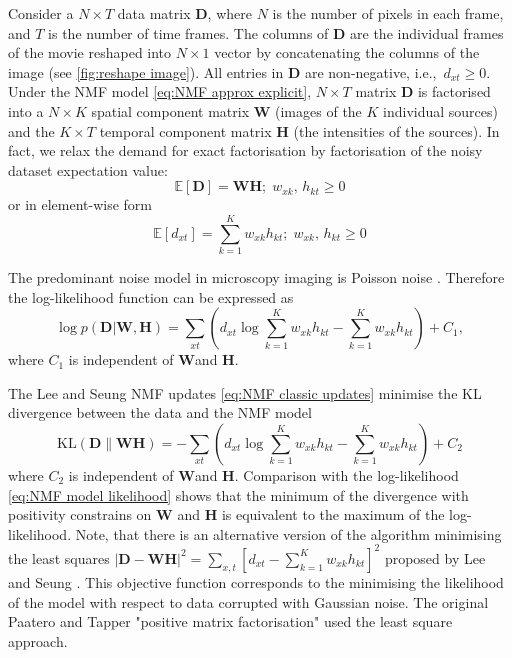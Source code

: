 Consider a $N\times T$ data matrix $\bm{D}$, where $N$ is the number of pixels in each frame, and $T$ is the number of time frames. The columns of $\bm{D}$ are the individual frames of the movie reshaped into $N\times 1$ vector by concatenating the columns of the image (see \autoref{fig:reshape image}). All entries in $\bm{D}$ are non-negative, i.e.,\ $d_{xt}\geq 0$. Under the NMF model \autoref{eq:NMF approx explicit}, $N\times T$ matrix $\bm{D}$ is factorised into a $N\times K$ spatial component matrix $\bm{W}$ (images of the $K$ individual sources) and the $K\times T$ temporal component matrix $\bm{H}$ (the intensities of the sources). In fact, we relax the demand for exact factorisation by factorisation of the noisy dataset expectation value:  
%
\begin{equation}
	\mathbb{E}\left[\bm{D}\right]=\bm{WH};\;w_{xk},\, h_{kt}\geq0
	\label{eq:NMF model}
\end{equation}
%
or in element-wise form
%
\begin{equation}
	\mathbb{E}\left[d_{xt}\right]=\sum_{k=1}^K w_{xk}h_{kt};\;w_{xk},\, h_{kt}\geq0
	\label{eq:NMF model element-wise}
\end{equation}

The predominant noise model in microscopy imaging is Poisson noise \cite{PawleyHandbook2006}. Therefore the log-likelihood function can be expressed as
%
\begin{equation}
	\log p(\bm{D}|\bm{W},\bm{H})=\sum_{xt}\left(d_{xt}\log\sum_{k=1}^K w_{xk}h_{kt}-\sum_{k=1}^K w_{xk}h_{kt}\right)+C_1,
	\label{eq:NMF model likelihood}
\end{equation}
%
where $C_1$ is independent of $\bm{W}$and $\bm{H}$. 

The Lee and Seung NMF updates \autoref{eq:NMF classic updates} minimise the KL divergence between the data and the NMF model
%
\begin{equation}
	\mbox{KL}(\bm{D}\parallel\bm{WH})=-\sum_{xt}\left(d_{xt}\log\sum_{k=1}^K w_{xk}h_{kt}-\sum_{k=1}^K w_{xk}h_{kt}\right)+C_2
	\label{eq:KL divergence}
\end{equation}
%
where $C_2$ is independent of $\bm{W}$and $\bm{H}$. Comparison with the log-likelihood \autoref{eq:NMF model likelihood} shows that the minimum of the divergence with positivity constrains on $\bm{W}$ and $\bm{H}$ is equivalent to the maximum of the log-likelihood. Note, that there is an alternative version of the algorithm minimising the least squares $|\bm{D}-\bm{WH}|^2=\sum_{x,t}\left[d_{xt}-\sum_{k=1}^K w_{xk}h_{kt}\right]^2$ proposed by Lee and Seung \cite{Lee2001}. This objective function corresponds to the minimising the likelihood of the model with respect to data corrupted with Gaussian noise. The original Paatero and Tapper "positive matrix factorisation" \cite{Paatero1994} used the least square approach. 

